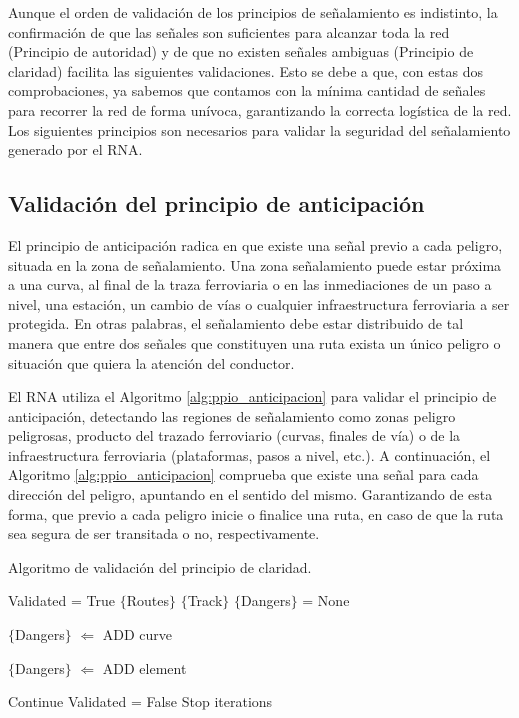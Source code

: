 		Aunque el orden de validación de los principios de señalamiento es indistinto, la confirmación de que las señales son suficientes para alcanzar toda la red (Principio de autoridad) y de que no existen señales ambiguas (Principio de claridad) facilita las siguientes validaciones. Esto se debe a que, con estas dos comprobaciones, ya sabemos que contamos con la mínima cantidad de señales para recorrer la red de forma unívoca, garantizando la correcta logística de la red. Los siguientes principios son necesarios para validar la seguridad del señalamiento generado por el RNA.
		
	\subsection{Validación del principio de anticipación}
		
		El principio de anticipación radica en que existe una señal previo a cada peligro, situada en la zona de señalamiento. Una zona señalamiento puede estar próxima a una curva, al final de la traza ferroviaria o en las inmediaciones de un paso a nivel, una estación, un cambio de vías o cualquier infraestructura ferroviaria a ser protegida. En otras palabras, el señalamiento debe estar distribuido de tal manera que entre dos señales que constituyen una ruta exista un único peligro o situación que quiera la atención del conductor.
		
		El RNA utiliza el Algoritmo \ref{alg:ppio_anticipacion} para validar el principio de anticipación, detectando las regiones de señalamiento como zonas peligro peligrosas, producto del trazado ferroviario (curvas, finales de vía) o de la infraestructura ferroviaria (plataformas, pasos a nivel, etc.). A continuación, el Algoritmo \ref{alg:ppio_anticipacion} comprueba que existe una señal para cada dirección del peligro, apuntando en el sentido del mismo. Garantizando de esta forma, que previo a cada peligro inicie o finalice una ruta, en caso de que la ruta sea segura de ser transitada o no, respectivamente.
		
		\begin{algorithm}[hbt!]
			\caption{Algoritmo de validación del principio de claridad.}\label{alg:ppio_anticipacion}
			\DontPrintSemicolon
			\SetNoFillComment
			\LinesNotNumbered 
			Validated = True\;
			$\{$Routes$\}$\; 
			$\{$Track$\}$\; 
			$\{$Dangers$\}$ = None\;
			
			{
				$\{$Dangers$\}$ $\Leftarrow$ ADD curve
			}
			
			{
				$\{$Dangers$\}$ $\Leftarrow$ ADD element
			}
			
			{
				
				{
					{
						Continue\;
					}
					\Else
					{
						Validated = False\; 
						Stop iterations\;
					}
				}	
			}
			
		\end{algorithm}
		
